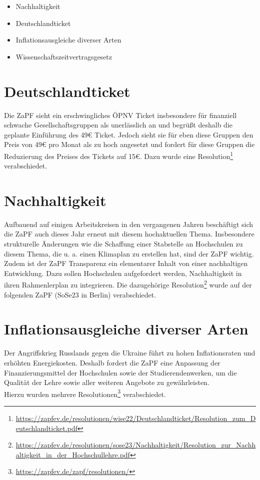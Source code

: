 \documentclass{scrartcl}
\begin{document}
	\begin{itemize}
		\item Nachhaltigkeit
		\item Deutschlandticket
		\item Inflationsausgleiche diverser Arten
		\item Wissenschaftszeitvertragsgesetz
	\end{itemize}
	
	\section*{Deutschlandticket}
	Die ZaPF sieht ein erschwingliches ÖPNV Ticket insbesondere für finanziell schwache Gesellschaftsgruppen als unerlässlich an und begrüßt deshalb die geplante Einführung des \si{49}{€} Ticket. Jedoch sieht sie für eben diese Gruppen den Preis von \si{49}{€} pro Monat als zu hoch angesetzt und fordert für diese Gruppen die Reduzierung des Preises des Tickets auf \si{15}{€}. Dazu wurde eine Resolution\footnote{\url{https://zapfev.de/resolutionen/wise22/Deutschlandticket/Resolution_zum_Deutschlandticket.pdf}} verabschiedet.
	
	\section*{Nachhaltigkeit}
	Aufbauend auf einigen Arbeitskreisen in den vergangenen Jahren beschäftigt sich die ZaPF auch dieses Jahr erneut mit diesem hochaktuellen Thema. Insbesondere strukturelle Änderungen wie die Schaffung einer Stabstelle an Hochschulen zu diesem Thema, die u. a. einen Klimaplan zu erstellen hat, sind der ZaPF wichtig.\\
	Zudem ist der ZaPF Transparenz ein elementarer Inhalt von einer nachhaltigen Entwicklung. Dazu sollen Hochschulen aufgefordert werden, Nachhaltigkeit in ihren Rahmenlerplan zu integrieren. Die dazugehörige Resolution\footnote{\url{https://zapfev.de/resolutionen/sose23/Nachhaltigkeit/Resolution_zur_Nachhaltigkeit_in_der_Hochschullehre.pdf}} wurde auf der folgenden ZaPF (SoSe23 in Berlin) verabschiedet.
	
	\section*{Inflationsausgleiche diverser Arten}
	Der Angriffskrieg Russlands gegen die Ukraine führt zu hohen Inflationsraten und erhöhten Energiekosten. Deshalb fordert die ZaPF eine Anpassung der Finanzierungsmittel der Hochschulen sowie der Studierendenwerken, um die Qualität der Lehre sowie aller weiteren Angebote zu gewährleisten.\\
	Hierzu wurden mehrere Resolutionen\footnote{\url{https://zapfev.de/zapf/resolutionen/}} verabschiedet.
	
\end{document}
